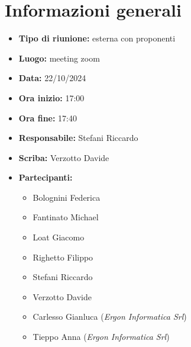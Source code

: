 \section{Informazioni generali}

\begin{itemize}
    \item \textbf{Tipo di riunione:} esterna con proponenti
    \item \textbf{Luogo:} meeting zoom
    \item \textbf{Data:} 22/10/2024
    \item \textbf{Ora inizio:} 17:00
    \item \textbf{Ora fine:} 17:40
    \item \textbf{Responsabile:} Stefani Riccardo
    \item \textbf{Scriba:} Verzotto Davide
    \item \textbf{Partecipanti:}
    \begin{itemize}
        \renewcommand{\labelitemii}{--}
        \item Bolognini Federica
        \item Fantinato Michael
        \item Loat Giacomo
        \item Righetto Filippo
        \item Stefani Riccardo
        \item Verzotto Davide
        \item Carlesso Gianluca (\emph{Ergon Informatica Srl})
        \item Tieppo Anna (\emph{Ergon Informatica Srl})
    \end{itemize}
\end{itemize}

